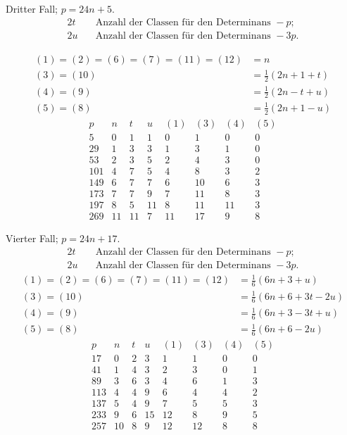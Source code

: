 Dritter Fall; $p=24n+5$.
\[
\begin{aligned}
2t&\quad\text{Anzahl der Classen für den Determinans }-p;\\
2u&\quad\text{Anzahl der Classen für den Determinans }-3p.
\end{aligned}
\]

\[
\begin{aligned}
(1)=(2)=(6)=(7)=(11)=(12)&=n\\
(3)=(10)&=\tfrac12(2n+1+t)\\
(4)=(9)&=\tfrac12(2n-t+u)\\
(5)=(8)&=\tfrac12(2n+1-u)
\end{aligned}
\]
\[
\begin{array}{r|r|r|r|r|r|r|r}
p&n&t&u&(1)&(3)&(4)&(5)\\\hline
5&0&1&1&0&1&0&0\\
29&1&3&3&1&3&1&0\\
53&2&3&5&2&4&3&0\\
101&4&7&5&4&8&3&2\\
149&6&7&7&6&10&6&3\\
173&7&7&9&7&11&8&3\\
197&8&5&11&8&11&11&3\\
269&11&11&7&11&17&9&8
\end{array}
\]

Vierter Fall; $p=24n+17$.
\[
\begin{aligned}
2t&\quad\text{Anzahl der Classen für den Determinans }-p;\\
2u&\quad\text{Anzahl der Classen für den Determinans }-3p.
\end{aligned}
\]
\[
\begin{aligned}
(1)=(2)=(6)=(7)=(11)=(12)&=\tfrac16(6n+3+u)\\
(3)=(10)&=\tfrac16(6n+6+3t-2u)\\
(4)=(9)&=\tfrac16(6n+3-3t+u)\\
(5)=(8)&=\tfrac16(6n+6-2u)
\end{aligned}
\]
\[
\begin{array}{r|r|r|r|r|r|r|r}
p&n&t&u&(1)&(3)&(4)&(5)\\\hline
17&0&2&3&1&1&0&0\\
41&1&4&3&2&3&0&1\\
89&3&6&3&4&6&1&3\\
113&4&4&9&6&4&4&2\\
137&5&4&9&7&5&5&3\\
233&9&6&15&12&8&9&5\\
257&10&8&9&12&12&8&8
\end{array}
\]
